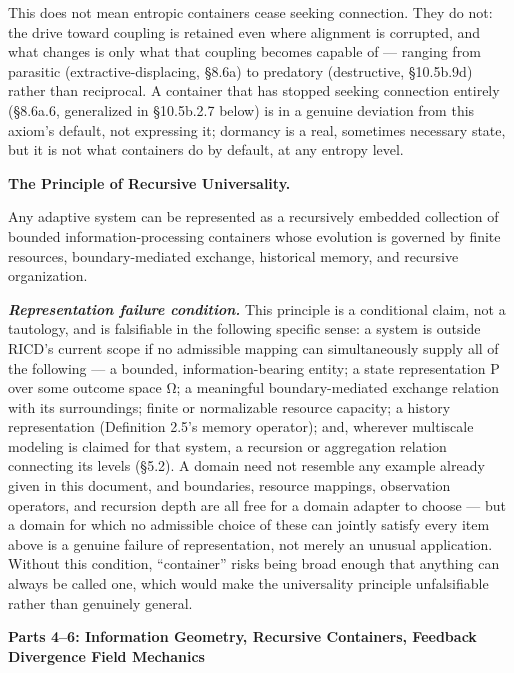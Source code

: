 \documentclass[
]{article}
\begin{document}
This does not mean entropic containers cease seeking connection. They do
not: the drive toward coupling is retained even where alignment is
corrupted, and what changes is only what that coupling becomes capable
of --- ranging from parasitic (extractive-displacing, §8.6a) to
predatory (destructive, §10.5b.9d) rather than reciprocal. A container
that has stopped seeking connection entirely (§8.6a.6, generalized in
§10.5b.2.7 below) is in a genuine deviation from this axiom's default,
not expressing it; dormancy is a real, sometimes necessary state, but it
is not what containers do by default, at any entropy level.

\textbf{The Principle of Recursive Universality.}

Any adaptive system can be represented as a recursively embedded
collection of bounded information-processing containers whose evolution
is governed by finite resources, boundary-mediated exchange, historical
memory, and recursive organization.

\emph{\textbf{Representation failure condition.}} This principle is a
conditional claim, not a tautology, and is falsifiable in the following
specific sense: a system is outside RICD's current scope if no
admissible mapping can simultaneously supply all of the following --- a
bounded, information-bearing entity; a state representation P over some
outcome space Ω; a meaningful boundary-mediated exchange relation with
its surroundings; finite or normalizable resource capacity; a history
representation (Definition 2.5's memory operator); and, wherever
multiscale modeling is claimed for that system, a recursion or
aggregation relation connecting its levels (§5.2). A domain need not
resemble any example already given in this document, and boundaries,
resource mappings, observation operators, and recursion depth are all
free for a domain adapter to choose --- but a domain for which no
admissible choice of these can jointly satisfy every item above is a
genuine failure of representation, not merely an unusual application.
Without this condition, ``container'' risks being broad enough that
anything can always be called one, which would make the universality
principle unfalsifiable rather than genuinely general.

\textbf{Parts 4--6: Information Geometry, Recursive Containers, Feedback
Divergence Field Mechanics}
\end{document}
